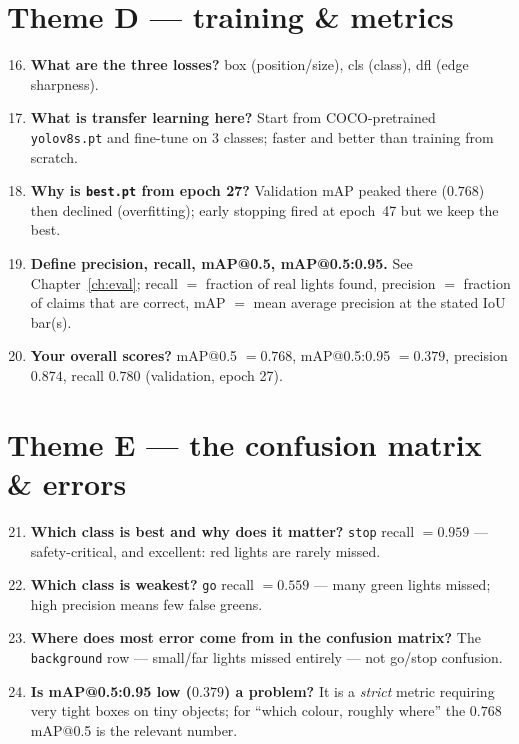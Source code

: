 \section{Theme D --- training \& metrics}
\begin{enumerate}\setcounter{enumi}{15}
  \item \textbf{What are the three losses?} box (position/size), cls
        (class), dfl (edge sharpness).
  \item \textbf{What is transfer learning here?} Start from
        COCO-pretrained \texttt{yolov8s.pt} and fine-tune on 3 classes;
        faster and better than training from scratch.
  \item \textbf{Why is \texttt{best.pt} from epoch 27?} Validation mAP
        peaked there ($0.768$) then declined (overfitting); early stopping
        fired at epoch~47 but we keep the best.
  \item \textbf{Define precision, recall, mAP@0.5, mAP@0.5:0.95.} See
        Chapter~\ref{ch:eval}; recall $=$ fraction of real lights found,
        precision $=$ fraction of claims that are correct, mAP $=$ mean
        average precision at the stated IoU bar(s).
  \item \textbf{Your overall scores?} mAP@0.5 $=0.768$, mAP@0.5:0.95
        $=0.379$, precision $0.874$, recall $0.780$ (validation, epoch 27).
\end{enumerate}

\section{Theme E --- the confusion matrix \& errors}
\begin{enumerate}\setcounter{enumi}{20}
  \item \textbf{Which class is best and why does it matter?} \texttt{stop}
        recall $=0.959$ --- safety-critical, and excellent: red lights are
        rarely missed.
  \item \textbf{Which class is weakest?} \texttt{go} recall $=0.559$ ---
        many green lights missed; high precision means few false greens.
  \item \textbf{Where does most error come from in the confusion
        matrix?} The \texttt{background} row --- small/far lights missed
        entirely --- not go/stop confusion.
  \item \textbf{Is mAP@0.5:0.95 low ($0.379$) a problem?} It is a
        \emph{strict} metric requiring very tight boxes on tiny objects;
        for ``which colour, roughly where'' the $0.768$ mAP@0.5 is the
        relevant number.
\end{enumerate}

